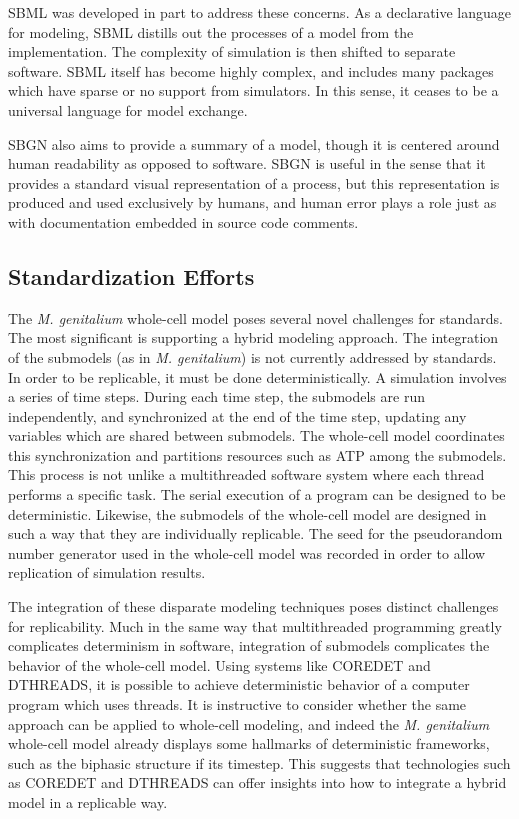 \documentclass[journal,transmag,twoside]{IEEEtran}
\begin{document}
SBML was developed in part to address these concerns. As a declarative language
for modeling, SBML distills out the processes of a model from the implementation.
The complexity of simulation is then shifted to separate software.
SBML itself has become highly complex, and includes many packages which
have sparse or no support from simulators.
In this sense, it ceases to be a universal language for model exchange.

SBGN also aims to provide a summary of a model, though it is centered
around human readability as opposed to software.
SBGN is useful in the sense that it provides a standard visual representation
of a process, but this representation is produced and used exclusively by humans,
and human error plays a role just as with documentation embedded in source code comments.

\subsection{Standardization Efforts}

The \textit{M. genitalium} whole-cell model poses several novel challenges for standards.
The most significant is supporting a hybrid modeling approach.
The integration of the submodels (as in \textit{M. genitalium}) is not currently
addressed by standards. In order to be replicable, it must be done deterministically.
A simulation involves a series of time steps. During each time step, the
submodels are run independently,
and synchronized at the end of the time step, updating any variables
which are shared between submodels.
The whole-cell model coordinates this synchronization and partitions resources such as ATP
among the submodels.
This process is not unlike a multithreaded software system where each thread performs
a specific task. The serial execution of a program can be designed to be deterministic.
Likewise, the submodels of the whole-cell model are designed in such a way that
they are individually replicable. The seed for the pseudorandom number generator
used in the whole-cell model was recorded in order to allow replication of simulation results.

The integration of these disparate modeling techniques poses distinct challenges for replicability.
Much in the same way that multithreaded programming greatly complicates
determinism in software, integration of submodels complicates the behavior
of the whole-cell model.
Using systems like C{\small ORE}D{\small ET} and D{\small THREADS}, it is possible
to achieve deterministic behavior of a computer program which uses threads.
It is instructive to consider whether the same approach can be applied to whole-cell
modeling, and indeed the \textit{M. genitalium} whole-cell model already displays
some hallmarks of deterministic frameworks, such as the biphasic structure if its timestep.
This suggests that technologies such as C{\small ORE}D{\small ET} and D{\small THREADS}
can offer insights into how to integrate a hybrid model in a replicable way.
\end{document}
